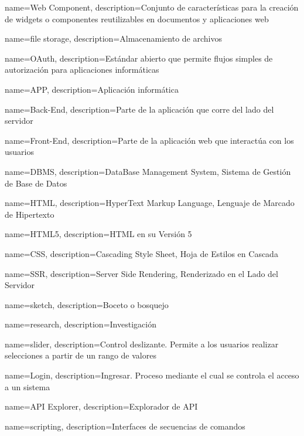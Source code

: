{
    name=Web Component,
    description={Conjunto de características para la creación de widgets o componentes reutilizables en documentos y aplicaciones web}
}

{
    name=file storage,
    description={Almacenamiento de archivos}
}

{
    name=OAuth,
    description={Estándar abierto que permite flujos simples de autorización para aplicaciones informáticas}
}


{
    name=APP,
    description={Aplicación informática}
}


{
    name=Back-End,
    description={Parte de la aplicación que corre del lado del servidor}
}

{
    name=Front-End,
    description={Parte de la aplicación web que interactúa con los usuarios }
}

{
    name=DBMS,
    description={DataBase Management System, Sistema de Gestión de Base de Datos}
}

{
    name=HTML,
    description={HyperText Markup Language, Lenguaje de Marcado de Hipertexto}
}

{
    name=HTML5,
    description={HTML en su Versión 5}
}

{
    name=CSS,
    description={Cascading Style Sheet, Hoja de Estilos en Cascada}
}

{
    name=SSR,
    description={Server Side Rendering, Renderizado en el Lado del Servidor}
}

{
    name=sketch,
    description={Boceto o bosquejo}
}

{
    name=research,
    description={Investigación}
}



{
    name=slider,
    description={Control deslizante. Permite a los usuarios realizar selecciones a partir de un rango de valores}
}

{
    name=Login,
    description={Ingresar. Proceso mediante el cual se controla el acceso a un sistema}
}

{
    name=API Explorer,
    description={Explorador de API}
}

{
    name=scripting,
    description={Interfaces de secuencias de comandos}
}